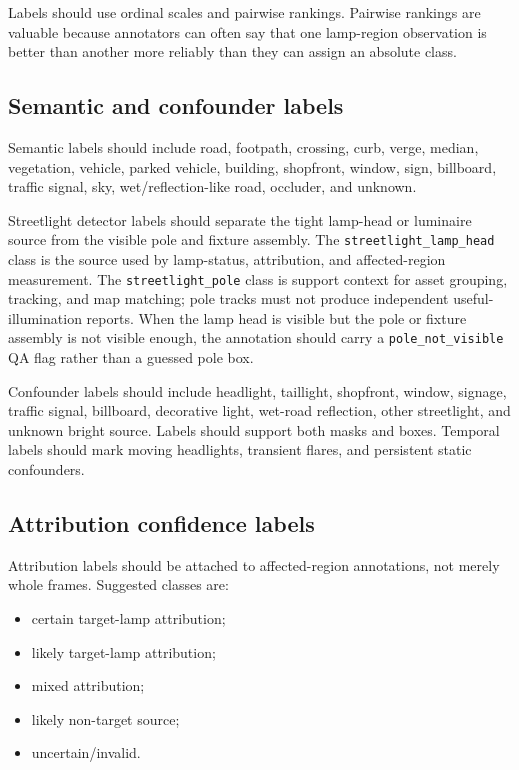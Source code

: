 \documentclass[11pt]{article}
\begin{document}
Labels should use ordinal scales and pairwise rankings. Pairwise rankings are valuable because annotators can often say that one lamp-region observation is better than another more reliably than they can assign an absolute class.

\subsection{Semantic and confounder labels}

Semantic labels should include road, footpath, crossing, curb, verge, median, vegetation, vehicle, parked vehicle, building, shopfront, window, sign, billboard, traffic signal, sky, wet/reflection-like road, occluder, and unknown.

Streetlight detector labels should separate the tight lamp-head or luminaire source from the visible pole and fixture assembly. The \texttt{streetlight\_lamp\_head} class is the source used by lamp-status, attribution, and affected-region measurement. The \texttt{streetlight\_pole} class is support context for asset grouping, tracking, and map matching; pole tracks must not produce independent useful-illumination reports. When the lamp head is visible but the pole or fixture assembly is not visible enough, the annotation should carry a \texttt{pole\_not\_visible} QA flag rather than a guessed pole box.

Confounder labels should include headlight, taillight, shopfront, window, signage, traffic signal, billboard, decorative light, wet-road reflection, other streetlight, and unknown bright source. Labels should support both masks and boxes. Temporal labels should mark moving headlights, transient flares, and persistent static confounders.

\subsection{Attribution confidence labels}

Attribution labels should be attached to affected-region annotations, not merely whole frames. Suggested classes are:
\begin{itemize}
  \item certain target-lamp attribution;
  \item likely target-lamp attribution;
  \item mixed attribution;
  \item likely non-target source;
  \item uncertain/invalid.
\end{itemize}
\end{document}
